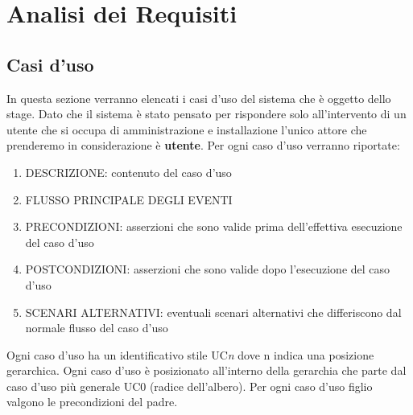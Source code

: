 
\section{Analisi dei Requisiti} \label{sec:analisi}
\subsection{Casi d'uso} \label{sec:casiduso}
In questa sezione verranno elencati i casi d'uso del sistema che è oggetto dello stage. Dato che il sistema è stato pensato per rispondere solo all'intervento di un utente che si occupa di amministrazione e installazione l'unico attore che prenderemo in considerazione è \textbf{utente}. Per ogni caso d'uso verranno riportate:
\begin{enumerate}
\item DESCRIZIONE: contenuto del caso d'uso
\item FLUSSO PRINCIPALE DEGLI EVENTI
\item PRECONDIZIONI: asserzioni che sono valide prima dell'effettiva esecuzione del caso d'uso
\item POSTCONDIZIONI: asserzioni che sono valide dopo l'esecuzione del caso d'uso
\item SCENARI ALTERNATIVI: eventuali scenari alternativi che differiscono dal normale flusso del caso d'uso
\end{enumerate}
Ogni caso d'uso ha un identificativo stile UC\textit{n} dove n indica una posizione gerarchica.
Ogni caso d'uso è posizionato all'interno della gerarchia che parte dal caso d'uso più generale UC0 (radice dell'albero). Per ogni caso d'uso figlio valgono le precondizioni del padre.

